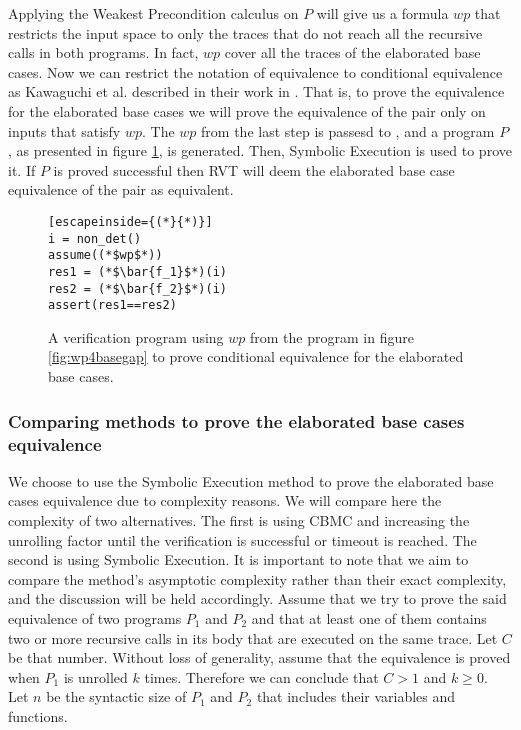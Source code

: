 Applying the Weakest Precondition calculus on $P$ will give us a formula $wp$ that restricts the input space to only the traces that do not reach all the recursive calls in both programs. In fact, $wp$ cover all the traces of the elaborated base cases. 
Now we can restrict the notation of equivalence to conditional equivalence as Kawaguchi et al. described in their work in \cite{kawaguchi2010conditional}. That is, to prove the equivalence for the elaborated base cases we will prove the equivalence of the pair only on inputs that satisfy $wp$. The $wp$ from the last step is passesd to , and a program $P$, as presented in figure \ref{fig:basegapvefprogram}, is generated. Then, Symbolic Execution is used to prove it. If $P$ is proved successful then RVT will deem the elaborated base case equivalence of the pair as equivalent. 
\begin{figure} [h]
\begin{center}
\begin{minipage}{7 cm}
\begin{lstlisting}[escapeinside={(*}{*)}]
i = non_det()
assume((*$wp$*))
res1 = (*$\bar{f_1}$*)(i)
res2 = (*$\bar{f_2}$*)(i)
assert(res1==res2)
\end{lstlisting}
\end{minipage}
\caption{A verification program using $wp$ from the program in figure \ref{fig:wp4basegap} to prove conditional equivalence for the elaborated base cases.}
\label{fig:basegapvefprogram}
\end{center}
\end{figure}

\subsubsection{Comparing methods to prove the elaborated base cases equivalence}
We choose to use the Symbolic Execution method to prove the elaborated base cases equivalence due to complexity reasons. We will compare here the complexity of two alternatives. The first is using CBMC and increasing the unrolling factor until the verification is successful or timeout is reached. The second is using Symbolic Execution. It is important to note that we aim to compare the method's asymptotic complexity rather than their exact complexity, and the discussion will be held accordingly.  
Assume that we try to prove the said equivalence of two programs $P_1$ and $P_2$ and that at least one of them contains two or more recursive calls in its body that are executed on the same trace. Let $C$ be that number. Without loss of generality, assume that the equivalence is proved when $P_1$ is unrolled $k$ times. Therefore we can conclude that $C > 1$ and $k \geq 0$. Let $n$ be the syntactic size of $P_1$ and $P_2$ that includes their variables and functions. 

